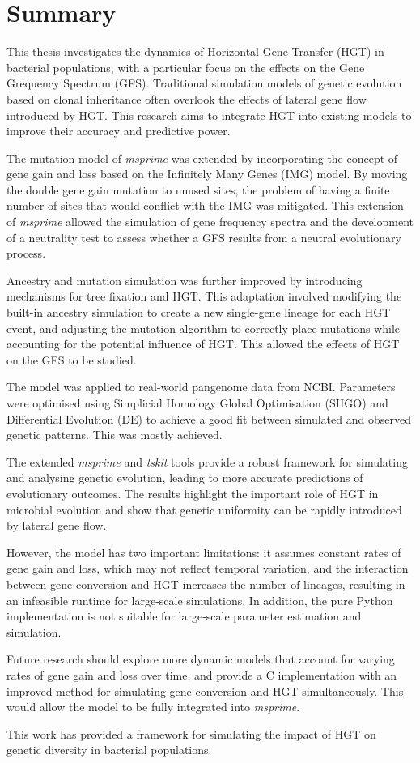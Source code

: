 \chapter{Summary}
This thesis investigates the dynamics of Horizontal Gene Transfer (HGT) in bacterial populations, with a particular focus on the effects on the Gene Grequency Spectrum (GFS).
Traditional simulation models of genetic evolution based on clonal inheritance often overlook the effects of lateral gene flow introduced by HGT.
This research aims to integrate HGT into existing models to improve their accuracy and predictive power.

The mutation model of \textit{msprime} was extended by incorporating the concept of gene gain and loss based on the Infinitely Many Genes (IMG) model.
By moving the double gene gain mutation to unused sites, the problem of having a finite number of sites that would conflict with the IMG was mitigated.
This extension of \textit{msprime} allowed the simulation of gene frequency spectra and the development of a neutrality test to assess whether a GFS results from a neutral evolutionary process.

Ancestry and mutation simulation was further improved by introducing mechanisms for tree fixation and HGT.
This adaptation involved modifying the built-in ancestry simulation to create a new single-gene lineage for each HGT event, and adjusting the mutation algorithm to correctly place mutations while accounting for the potential influence of HGT.
This allowed the effects of HGT on the GFS to be studied.

The model was applied to real-world pangenome data from NCBI. Parameters were optimised using Simplicial Homology Global Optimisation (SHGO) and Differential Evolution (DE) to achieve a good fit between simulated and observed genetic patterns.
This was mostly achieved.

The extended \textit{msprime} and \textit{tskit} tools provide a robust framework for simulating and analysing genetic evolution, leading to more accurate predictions of evolutionary outcomes.
The results highlight the important role of HGT in microbial evolution and show that genetic uniformity can be rapidly introduced by lateral gene flow.

However, the model has two important limitations: it assumes constant rates of gene gain and loss, which may not reflect temporal variation, and the interaction between gene conversion and HGT increases the number of lineages, resulting in an infeasible runtime for large-scale simulations.
In addition, the pure Python implementation is not suitable for large-scale parameter estimation and simulation.

Future research should explore more dynamic models that account for varying rates of gene gain and loss over time, and provide a C implementation with an improved method for simulating gene conversion and HGT simultaneously.
This would allow the model to be fully integrated into \textit{msprime}.

This work has provided a framework for simulating the impact of HGT on genetic diversity in bacterial populations.